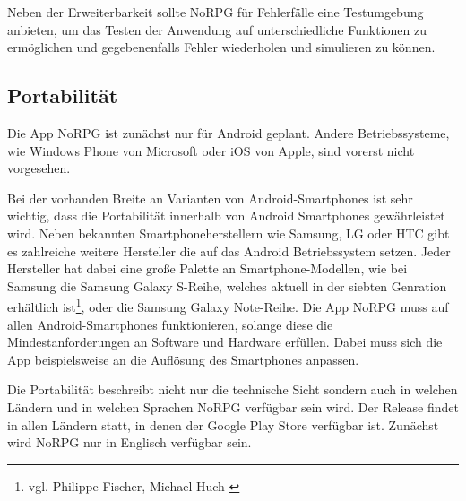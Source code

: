 		Neben der Erweiterbarkeit sollte NoRPG für Fehlerfälle eine Testumgebung anbieten, um das Testen der Anwendung auf unterschiedliche Funktionen zu ermöglichen und gegebenenfalls Fehler wiederholen und simulieren zu können.
		
	\subsection{Portabilität}
		Die App NoRPG ist zunächst nur für Android geplant. Andere Betriebssysteme, wie Windows Phone von Microsoft oder iOS von Apple, sind vorerst nicht vorgesehen. 
		
		Bei der vorhanden Breite an Varianten von Android-Smartphones ist sehr wichtig, dass die Portabilität innerhalb von Android Smartphones gewährleistet wird. Neben bekannten Smartphoneherstellern wie Samsung, LG oder HTC gibt es zahlreiche weitere Hersteller die auf das Android Betriebssystem setzen. Jeder Hersteller hat dabei eine große Palette an Smartphone-Modellen, wie bei Samsung die Samsung Galaxy S-Reihe, welches aktuell in der siebten Genration erhältlich ist\footnote{vgl. Philippe Fischer, Michael Huch \cite{computerBildSamsung}}, oder die Samsung Galaxy Note-Reihe. Die App NoRPG muss auf allen Android-Smartphones funktionieren, solange diese die Mindestanforderungen an Software und Hardware erfüllen. Dabei muss sich die App beispielsweise an die Auflösung des Smartphones anpassen.
		
		Die Portabilität beschreibt nicht nur die technische Sicht sondern auch in welchen Ländern und in welchen Sprachen NoRPG verfügbar sein wird. Der Release findet in allen Ländern statt, in denen der Google Play Store verfügbar ist. Zunächst wird NoRPG nur in Englisch verfügbar sein.